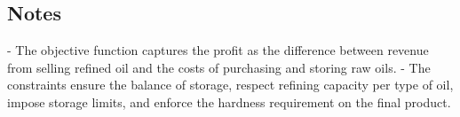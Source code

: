 \documentclass{article}
\begin{document}
\subsection*{Notes}
- The objective function captures the profit as the difference between revenue from selling refined oil and the costs of purchasing and storing raw oils.
- The constraints ensure the balance of storage, respect refining capacity per type of oil, impose storage limits, and enforce the hardness requirement on the final product.
\end{document}
